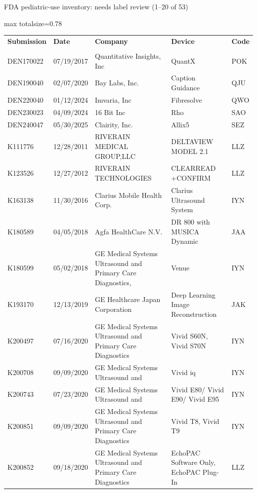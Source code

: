 \documentclass[aspectratio=169]{beamer}
\renewcommand{\arraystretch}{1.08}
\begin{document}
\begin{frame}[category=FDA appendix]{FDA pediatric-use inventory: needs label review (1--20 of 53)}
\begin{adjustbox}{max totalsize={\textwidth}{0.78\textheight}}
\renewcommand{\arraystretch}{1.2}
\begin{tabular}{|p{}|p{}|p{}|p{}|p{}|}
\hline \textbf{Submission} & \textbf{Date} & \textbf{Company} & \textbf{Device} & \textbf{Code} \\\\ \hline
DEN170022 & 07/19/2017 & Quantitative Insights, Inc & QuantX & POK \\ \hline
DEN190040 & 02/07/2020 & Bay Labs, Inc. & Caption Guidance & QJU \\ \hline
DEN220040 & 01/12/2024 & Imvaria, Inc & Fibresolve & QWO \\ \hline
DEN230023 & 04/09/2024 & 16 Bit Inc & Rho & SAO \\ \hline
DEN240047 & 05/30/2025 & Clairity, Inc. & Allix5 & SEZ \\ \hline
K111776 & 12/28/2011 & RIVERAIN MEDICAL GROUP,LLC & DELTAVIEW MODEL 2.1 & LLZ \\ \hline
K123526 & 12/27/2012 & RIVERAIN TECHNOLOGIES & CLEARREAD +CONFIRM & LLZ \\ \hline
K163138 & 11/30/2016 & Clarius Mobile Health Corp. & Clarius Ultrasound System & IYN \\ \hline
K180589 & 04/05/2018 & Agfa HealthCare N.V. & DR 800 with MUSICA Dynamic & JAA \\ \hline
K180599 & 05/02/2018 & GE Medical Systems Ultrasound and Primary Care Diagnostics, & Venue & IYN \\ \hline
K193170 & 12/13/2019 & GE Healthcare Japan Corporation & Deep Learning Image Reconstruction & JAK \\ \hline
K200497 & 07/16/2020 & GE Medical Systems Ultrasound and Primary Care Diagnostics & Vivid S60N, Vivid S70N & IYN \\ \hline
K200708 & 09/09/2020 & GE Medical Systems Ultrasound and & Vivid iq & IYN \\ \hline
K200743 & 07/23/2020 & GE Medical Systems Ultrasound and & Vivid E80/ Vivid E90/ Vivid E95 & IYN \\ \hline
K200851 & 09/09/2020 & GE Medical Systems Ultrasound and Primary Care Diagnostics & Vivid T8, Vivid T9 & IYN \\ \hline
K200852 & 09/18/2020 & GE Medical Systems Ultrasound and Primary Care Diagnostics & EchoPAC Software Only, EchoPAC Plug-In & LLZ \\ \hline

\end{tabular}
\end{adjustbox}
\end{frame}
\end{document}

